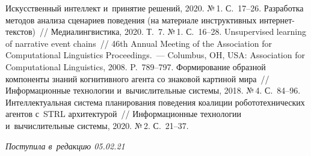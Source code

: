 \begin{multicols}{2}
{{\begin{thebibliography}{99}
Искусственный интеллект и~принятие решений, 2020. №\,1. С.~17--26.
Разработка методов анализа сценариев поведения (на материале инструктивных  
ин\-тер\-нет-текс\-тов)~// Медиалингвистика, 2020. Т.~7. №\,1. С.~16--28.
   Unsupervised learning of narrative event chains~// 46th Annual Meeting 
  of the Association for Computational Linguistics Proceedings.~---
  Columbus, OH, USA: Association for Computational Linguistics, 2008.
   P.~789--797.
   Формирование образной компоненты знаний когнитивного агента со 
знаковой картиной мира~// Информационные технологии и~вычислительные системы, 2018. 
№\,4. С.~84--96.
   Интеллектуальная система планирования поведения коалиции 
робототехнических агентов с~STRL архитектурой~// Информационные технологии 
и~вычислительные системы, 2020. №\,2. С.~21--37.
\end{thebibliography}

 }
 }

\end{multicols}

\vspace*{-6pt}

\hfill{\small\textit{Поступила в~редакцию 05.02.21}}



\newpage

\vspace*{-28pt}





\def\tit{PERSONAL COGNITIVE ASSISTANT:\\ PLANNING ACTIVITY WITH~SCRIPTS}


\def\titkol{Personal cognitive assistant: Planning activity with~scripts}


\def\aut{I.\,V.~Smirnov$^{1,2}$, A.\,I.~Panov$^{1,3}$, A.\,A.~Chuganskaya$^{1}$, M.\,I.~Suvorova$^1$, 
G.\,A.~Kiselev$^{1,2}$, I.\,A.~Kuruzov$^3$, and~O.\,G.~Grigoriev$^1$}

\def\autkol{I.\,V.~Smirnov, A.\,I.~Panov, A.\,A.~Chuganskaya, et al.}

